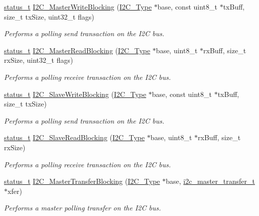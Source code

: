 \begin{DoxyCompactItemize}
\mbox{\hyperlink{group__ksdk__common_gaaabdaf7ee58ca7269bd4bf24efcde092}{status\+\_\+t}} \mbox{\hyperlink{group__i2c__driver_gac4e1a954243aa852cb4d358e90091efd}{I2\+C\+\_\+\+Master\+Write\+Blocking}} (\mbox{\hyperlink{struct_i2_c___type}{I2\+C\+\_\+\+Type}} $\ast$base, const uint8\+\_\+t $\ast$tx\+Buff, size\+\_\+t tx\+Size, uint32\+\_\+t flags)
\begin{DoxyCompactList}\small\item\em Performs a polling send transaction on the I2C bus. \end{DoxyCompactList}\item 
\mbox{\hyperlink{group__ksdk__common_gaaabdaf7ee58ca7269bd4bf24efcde092}{status\+\_\+t}} \mbox{\hyperlink{group__i2c__driver_gaf77526f32a16109abf265dbb022a26ba}{I2\+C\+\_\+\+Master\+Read\+Blocking}} (\mbox{\hyperlink{struct_i2_c___type}{I2\+C\+\_\+\+Type}} $\ast$base, uint8\+\_\+t $\ast$rx\+Buff, size\+\_\+t rx\+Size, uint32\+\_\+t flags)
\begin{DoxyCompactList}\small\item\em Performs a polling receive transaction on the I2C bus. \end{DoxyCompactList}\item 
\mbox{\hyperlink{group__ksdk__common_gaaabdaf7ee58ca7269bd4bf24efcde092}{status\+\_\+t}} \mbox{\hyperlink{group__i2c__driver_ga280404c6b1ede542f2c1c20bd382869c}{I2\+C\+\_\+\+Slave\+Write\+Blocking}} (\mbox{\hyperlink{struct_i2_c___type}{I2\+C\+\_\+\+Type}} $\ast$base, const uint8\+\_\+t $\ast$tx\+Buff, size\+\_\+t tx\+Size)
\begin{DoxyCompactList}\small\item\em Performs a polling send transaction on the I2C bus. \end{DoxyCompactList}\item 
\mbox{\hyperlink{group__ksdk__common_gaaabdaf7ee58ca7269bd4bf24efcde092}{status\+\_\+t}} \mbox{\hyperlink{group__i2c__driver_ga89baaf8bc82b19c837032665e89a1707}{I2\+C\+\_\+\+Slave\+Read\+Blocking}} (\mbox{\hyperlink{struct_i2_c___type}{I2\+C\+\_\+\+Type}} $\ast$base, uint8\+\_\+t $\ast$rx\+Buff, size\+\_\+t rx\+Size)
\begin{DoxyCompactList}\small\item\em Performs a polling receive transaction on the I2C bus. \end{DoxyCompactList}\item 
\mbox{\hyperlink{group__ksdk__common_gaaabdaf7ee58ca7269bd4bf24efcde092}{status\+\_\+t}} \mbox{\hyperlink{group__i2c__driver_ga35cae3a5b4aa50ce8db28e3eb703a027}{I2\+C\+\_\+\+Master\+Transfer\+Blocking}} (\mbox{\hyperlink{struct_i2_c___type}{I2\+C\+\_\+\+Type}} $\ast$base, \mbox{\hyperlink{group__i2c__driver_ga0e25c3c153992361c8d359a86b70d3c6}{i2c\+\_\+master\+\_\+transfer\+\_\+t}} $\ast$xfer)
\begin{DoxyCompactList}\small\item\em Performs a master polling transfer on the I2C bus. \end{DoxyCompactList}\end{DoxyCompactItemize}

